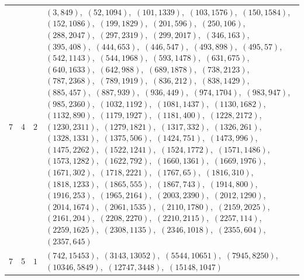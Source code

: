 \documentclass[11pt]{article}
\begin{document}
{\begin{longtable}{@{}rrl>{\raggedright\arraybackslash}p{}@{}}
7 & 4 & $2$ & $(3,849)$,\allowbreak\ $(52,1094)$,\allowbreak\ $(101,1339)$,\allowbreak\ $(103,1576)$,\allowbreak\ $(150,1584)$,\allowbreak\ $(152,1086)$,\allowbreak\ $(199,1829)$,\allowbreak\ $(201,596)$,\allowbreak\ $(250,106)$,\allowbreak\ $(288,2047)$,\allowbreak\ $(297,2319)$,\allowbreak\ $(299,2017)$,\allowbreak\ $(346,163)$,\allowbreak\ $(395,408)$,\allowbreak\ $(444,653)$,\allowbreak\ $(446,547)$,\allowbreak\ $(493,898)$,\allowbreak\ $(495,57)$,\allowbreak\ $(542,1143)$,\allowbreak\ $(544,1968)$,\allowbreak\ $(593,1478)$,\allowbreak\ $(631,675)$,\allowbreak\ $(640,1633)$,\allowbreak\ $(642,988)$,\allowbreak\ $(689,1878)$,\allowbreak\ $(738,2123)$,\allowbreak\ $(787,2368)$,\allowbreak\ $(789,1919)$,\allowbreak\ $(836,212)$,\allowbreak\ $(838,1429)$,\allowbreak\ $(885,457)$,\allowbreak\ $(887,939)$,\allowbreak\ $(936,449)$,\allowbreak\ $(974,1704)$,\allowbreak\ $(983,947)$,\allowbreak\ $(985,2360)$,\allowbreak\ $(1032,1192)$,\allowbreak\ $(1081,1437)$,\allowbreak\ $(1130,1682)$,\allowbreak\ $(1132,890)$,\allowbreak\ $(1179,1927)$,\allowbreak\ $(1181,400)$,\allowbreak\ $(1228,2172)$,\allowbreak\ $(1230,2311)$,\allowbreak\ $(1279,1821)$,\allowbreak\ $(1317,332)$,\allowbreak\ $(1326,261)$,\allowbreak\ $(1328,1331)$,\allowbreak\ $(1375,506)$,\allowbreak\ $(1424,751)$,\allowbreak\ $(1473,996)$,\allowbreak\ $(1475,2262)$,\allowbreak\ $(1522,1241)$,\allowbreak\ $(1524,1772)$,\allowbreak\ $(1571,1486)$,\allowbreak\ $(1573,1282)$,\allowbreak\ $(1622,792)$,\allowbreak\ $(1660,1361)$,\allowbreak\ $(1669,1976)$,\allowbreak\ $(1671,302)$,\allowbreak\ $(1718,2221)$,\allowbreak\ $(1767,65)$,\allowbreak\ $(1816,310)$,\allowbreak\ $(1818,1233)$,\allowbreak\ $(1865,555)$,\allowbreak\ $(1867,743)$,\allowbreak\ $(1914,800)$,\allowbreak\ $(1916,253)$,\allowbreak\ $(1965,2164)$,\allowbreak\ $(2003,2390)$,\allowbreak\ $(2012,1290)$,\allowbreak\ $(2014,1674)$,\allowbreak\ $(2061,1535)$,\allowbreak\ $(2110,1780)$,\allowbreak\ $(2159,2025)$,\allowbreak\ $(2161,204)$,\allowbreak\ $(2208,2270)$,\allowbreak\ $(2210,2115)$,\allowbreak\ $(2257,114)$,\allowbreak\ $(2259,1625)$,\allowbreak\ $(2308,1135)$,\allowbreak\ $(2346,1018)$,\allowbreak\ $(2355,604)$,\allowbreak\ $(2357,645)$\\
7 & 5 & $1$ & $(742,15453)$,\allowbreak\ $(3143,13052)$,\allowbreak\ $(5544,10651)$,\allowbreak\ $(7945,8250)$,\allowbreak\ $(10346,5849)$,\allowbreak\ $(12747,3448)$,\allowbreak\ $(15148,1047)$\\

\end{longtable}}
\end{document}

